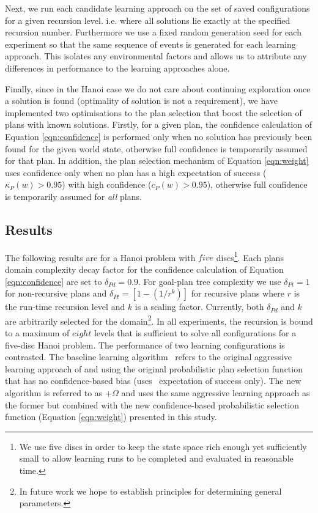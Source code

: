 Next, we run each candidate learning approach on the set of saved configurations for a given recursion level. i.e. where all solutions lie exactly at the specified recursion number. Furthermore we use a fixed random generation seed for each experiment so that the same sequence of  events is generated for each learning approach. This isolates any environmental factors and allows us to attribute any differences in performance to the learning approaches alone.

Finally, since in the Hanoi case we do not care about continuing exploration once a solution is found (optimality of solution is not a requirement), we have implemented two optimisations to the plan selection that boost the selection of plans with known solutions. Firstly, for a given plan, the confidence calculation of Equation \ref{eqn:confidence} is performed only when no solution has previously been found for the given world state, otherwise full confidence is temporarily assumed for that plan. In addition, the plan selection mechanism of Equation \ref{eqn:weight} uses confidence only when no plan has a high expectation of success ($\kappa_P(w) > 0.95$) with high confidence ($c_P(w) > 0.95$), otherwise full confidence is temporarily assumed for \textit{all} plans. 

\subsection{Results}

The following results are for a Hanoi problem with $five$ discs\footnote{We use five discs in order to keep the state space rich enough yet sufficiently small to allow learning runs to be completed and evaluated in reasonable time.}. Each plans domain complexity decay factor for the confidence calculation of Equation \ref{eqn:confidence} are set to $\delta_{Pd} = 0.9$. For goal-plan tree complexity we use $\delta_{Pt} =1$ for non-recursive plans and $\delta_{Pt} =\left[1-(1/r^k)\right]$ for recursive plans where $r$ is the run-time recursion level and $k$ is a scaling factor. Currently, both $\delta_{Pd}$ and $k$ are arbitrarily selected for the domain\footnote{In future work we hope to establish principles for determining general parameters.}. In all experiments, the recursion is bound to a maximum of $eight$ levels that is sufficient to solve all configurations for a five-disc Hanoi problem. The performance of two learning configurations is contrasted. The baseline learning algorithm \CL\ refers to the original aggressive learning approach of \cite{Airiau:IJAT:09} and \cite{Singh:AAMAS10} using the original probabilistic plan selection function that has no confidence-based bias (uses \dt\ expectation of success only). The new algorithm is referred to as \CL+$\Omega$ and uses the same aggressive learning approach as the former but combined with the new confidence-based probabilistic selection function (Equation \ref{eqn:weight}) presented in this study.

